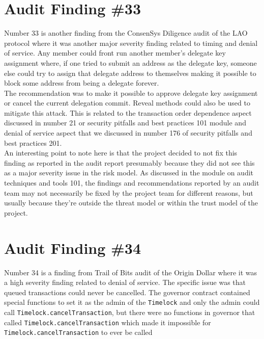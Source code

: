 \section{Audit Finding \#33}

Number 33 is another finding from the ConsenSys Diligence audit of the LAO protocol where it was another major severity finding related to timing and denial of service. Any member could front run another member's delegate key assignment where, if one tried to submit an address as the delegate key, someone else could try to assign that delegate address to themselves making it possible to block some address from being a delegate forever.\\

The recommendation was to make it possible to approve delegate key assignment or cancel the current delegation commit. Reveal methods could also be used to mitigate this attack. This is related to the transaction order dependence aspect discussed in number 21 or security pitfalls and best practices 101 module and denial of service aspect that we discussed in number 176 of security pitfalls and best practices 201.\\

An interesting point to note here is that the project decided to not fix this finding as reported in the audit report presumably because they did not see this as a major severity issue in the risk model. As discussed in the module on audit techniques and tools 101, the findings and recommendations reported by an audit team may not necessarily be fixed by the project team for different reasons, but usually because they're outside the threat model or within the trust model of the project.

\section{Audit Finding \#34}

Number 34 is a finding from Trail of Bits audit of the Origin Dollar where it was a high severity finding related to denial of service. The specific issue was that queued transactions could never be cancelled. The governor contract contained special functions to set it as the admin of the \verb|Timelock| and only the admin could call \verb|Timelock.cancelTransaction|, but there were no functions in governor that called \verb|Timelock.cancelTransaction| which made it impossible for \verb|Timelock.cancelTransaction| to ever be called\\

